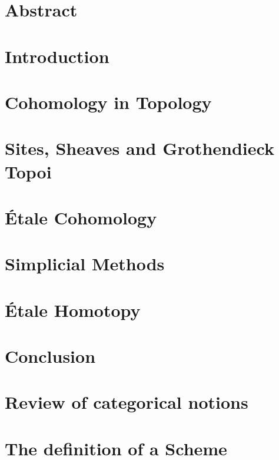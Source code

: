 \documentclass[11pt, openany]{memoir}
\theoremstyle{definition}
\begin{document}
  \nocite{*}

  \chapter*{Abstract}
  

  \begin{KeepFromToc} 
  \tableofcontents
  \end{KeepFromToc} 

  \chapter{Introduction}
  

  \chapter{Cohomology in Topology}
  

  \chapter{Sites, Sheaves and Grothendieck Topoi}
  

  \chapter{\'Etale Cohomology}
  

  \chapter{Simplicial Methods}
  

  \chapter{\'Etale Homotopy}

  \chapter{Conclusion}
  

  \appendix
  \chapter{Review of categorical notions}
  
  \chapter{The definition of a Scheme}
  

  
  
\end{document}
